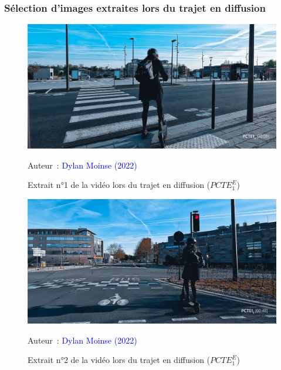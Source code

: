 \subsubsection{Sélection d'images extraites lors du trajet en diffusion}

    \begin{figure}[h!]\vspace*{4pt}
        \caption*{Extrait n°1 de la vidéo lors du trajet en diffusion (\(PCTE^{E}_{1}\))}
        \centerline{\includegraphics[width=0.75\columnwidth]{src/Figures/Annexes/Extrait_Video_PCTE1_Egress_1.jpg}}
        \vspace{5pt}
        \begin{flushright}\scriptsize{
        Auteur~: \textcolor{blue}{Dylan Moinse (2022)}
        }\end{flushright}
    \end{figure}

    \begin{figure}[h!]\vspace*{4pt}
        \caption*{Extrait n°2 de la vidéo lors du trajet en diffusion (\(PCTE^{E}_{1}\))}
        \centerline{\includegraphics[width=0.75\columnwidth]{src/Figures/Annexes/Extrait_Video_PCTE1_Egress_2.jpg}}
        \vspace{5pt}
        \begin{flushright}\scriptsize{
        Auteur~: \textcolor{blue}{Dylan Moinse (2022)}
        }\end{flushright}
    \end{figure}

